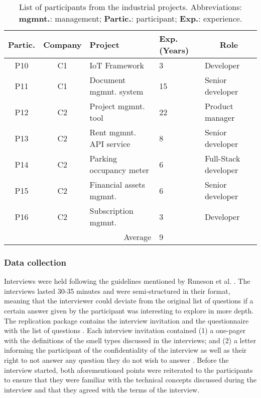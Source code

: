 \begin{table}[]
    \centering
    \footnotesize
    \caption{List of participants from the industrial projects. Abbreviations: \textbf{mgmnt.}: management; \textbf{Partic.}: participant; \textbf{Exp.}: experience.}
    \label{c6:tab:industrial-participants}
    \begin{tabular}{@{}ccm{2cm}m{0.5cm}l@{}}
    \toprule
    \textbf{Partic.} & \textbf{Company} & \textbf{Project} & \textbf{Exp. (Years)} & \multicolumn{1}{c}{\textbf{Role}} \\ \midrule
    P10 & C1 & IoT Framework & 3 & Developer \\ %
    P11 & C1 & Document mgmnt. system & 15 & Senior developer \\ %
    P12 & C2 & Project mgmnt. tool & 22 & Product manager\\ %
    P13 & C2 & Rent mgmnt. API service & 8 & Senior developer \\ %
    P14 & C2 & Parking occupancy meter & 6 & Full-Stack developer \\ %
    P15 & C2 & Financial assets mgmnt. & 6 & Senior developer \\ %
    P16 & C2 & Subscription mgmnt. & 3 & Developer \\ \midrule %
    \multicolumn{3}{r}{Average} & 9 &  \\ \bottomrule
    \end{tabular}
\end{table}

\subsubsection{Data collection}
Interviews were held following the guidelines mentioned by Runeson et al. \cite{Runeson2012}.
The interviews lasted 30-35 minutes and were semi-structured in their format, meaning that the interviewer could deviate from the original list of questions if a certain answer given by the participant was interesting to explore in more depth. The replication package contains the interview invitation and the questionnaire with the list of questions \cite{ReplicationPackageC6}.
Each interview invitation contained (1) a one-pager with the definitions of the smell types discussed in the interviews; and (2) a letter informing the participant of the confidentiality of the interview as well as their right to not answer any question they do not wish to answer \cite{Runeson2012}.
Before the interview started, both aforementioned points were reiterated to the participants to ensure that they were familiar with the technical concepts discussed during the interview and that they agreed with the terms of the interview.
 

